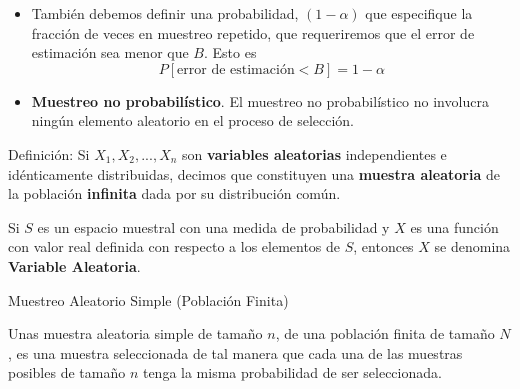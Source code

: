 \documentclass[
  10pt,
  ignorenonframetext,
]{beamer}
\providecommand{\tightlist}{%
  \setlength{\itemsep}{0pt}\setlength{\parskip}{0pt}}
\begin{document}
\begin{frame}{}
\protect\hypertarget{section-8}{}
\begin{block}{}
\protect\hypertarget{section-9}{}
\begin{itemize}
\tightlist
\item
  También debemos definir una probabilidad, \((1-\alpha)\) que
  especifique la fracción de veces en muestreo repetido, que
  requeriremos que el error de estimación sea menor que \(B\). Esto es
  \[P[\mbox{error de estimación} < B] = 1 - \alpha\]
\end{itemize}
\end{block}

\begin{block}{}
\protect\hypertarget{section-10}{}
\begin{itemize}
\tightlist
\item
  \textbf{Muestreo no probabilístico}. El muestreo no probabilístico no
  involucra ningún elemento aleatorio en el proceso de selección.
\end{itemize}
\end{block}
\end{frame}

\begin{frame}{}
\protect\hypertarget{section-11}{}
Definición: Si \(X_1, X_2, ..., X_n\) son \textbf{variables aleatorias}
independientes e idénticamente distribuidas, decimos que constituyen una
\textbf{muestra aleatoria} de la población \textbf{infinita} dada por su
distribución común.

Si \(S\) es un espacio muestral con una medida de probabilidad y \(X\)
es una función con valor real definida con respecto a los elementos de
\(S\), entonces \(X\) se denomina \textbf{Variable Aleatoria}.
\end{frame}

\begin{frame}{Muestreo Aleatorio Simple (Población Finita)}
\protect\hypertarget{muestreo-aleatorio-simple-poblaciuxf3n-finita}{}
\begin{block}{}
\protect\hypertarget{section-12}{}
Unas muestra aleatoria simple de tamaño \(n\), de una población finita
de tamaño \(N\), es una muestra seleccionada de tal manera que cada una
de las muestras posibles de tamaño \(n\) tenga la misma probabilidad de
ser seleccionada.
\end{block}
\end{frame}
\end{document}
